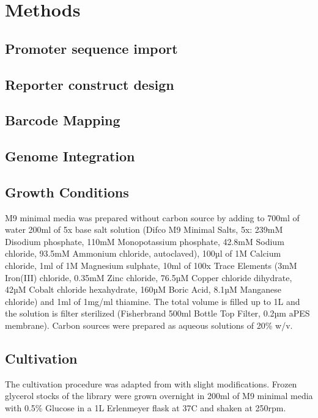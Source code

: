 \section{Methods}
\subsection{Promoter sequence import}
\subsection{Reporter construct design}
\subsection{Barcode Mapping}


\subsection{Genome Integration}
\subsection{Growth Conditions}
M9 minimal media was prepared without carbon source by adding to 700ml of water 200ml of 5x base salt solution (Difco M9 Minimal Salts, 5x: 239mM Disodium phosphate, 110mM Monopotassium phosphate, 42.8mM Sodium chloride, 93.5mM Ammonium chloride, autoclaved), 100µl of 1M Calcium chloride, 1ml of 1M Magnesium sulphate, 10ml of 100x Trace Elements (3mM Iron(III) chloride, 0.35mM Zinc chloride, 76.5µM Copper chloride dihydrate, 42µM Cobalt chloride hexahydrate, 160µM Boric Acid, 8.1µM Manganese chloride)\cite{flamholz2020functional} and 1ml of 1mg/ml thiamine. The total volume is filled up to 1L and the solution is filter sterilized (Fisherbrand 500ml Bottle Top Filter, 0.2µm aPES membrane). Carbon sources were prepared as aqueous solutions of 20\% w/v. 

\subsection{Cultivation}
The cultivation procedure was adapted from \cite{schmidt2016quantitative} with slight modifications. Frozen glycerol stocks of the library were grown overnight in 200ml of M9 minimal media with 0.5\% Glucose in a 1L Erlenmeyer flask at 37C and shaken at 250rpm.